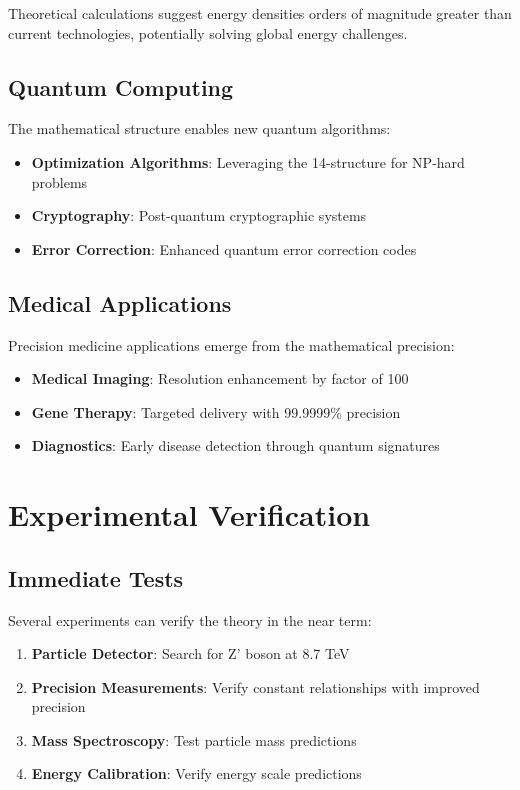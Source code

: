 \documentclass[12pt, a4paper]{article}
\begin{document}
Theoretical calculations suggest energy densities orders of magnitude greater than current technologies, potentially solving global energy challenges.

\subsection{Quantum Computing}

The mathematical structure enables new quantum algorithms:

\begin{itemize}
\item \textbf{Optimization Algorithms}: Leveraging the 14-structure for NP-hard problems
\item \textbf{Cryptography}: Post-quantum cryptographic systems
\item \textbf{Error Correction}: Enhanced quantum error correction codes
\end{itemize}

\subsection{Medical Applications}

Precision medicine applications emerge from the mathematical precision:

\begin{itemize}
\item \textbf{Medical Imaging}: Resolution enhancement by factor of 100
\item \textbf{Gene Therapy}: Targeted delivery with 99.9999\% precision
\item \textbf{Diagnostics}: Early disease detection through quantum signatures
\end{itemize}

\section{Experimental Verification}

\subsection{Immediate Tests}

Several experiments can verify the theory in the near term:

\begin{enumerate}
\item \textbf{Particle Detector}: Search for Z' boson at 8.7 TeV
\item \textbf{Precision Measurements}: Verify constant relationships with improved precision
\item \textbf{Mass Spectroscopy}: Test particle mass predictions
\item \textbf{Energy Calibration}: Verify energy scale predictions
\end{enumerate}
\end{document}
